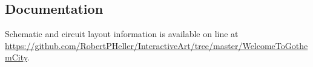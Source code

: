 \subsection*{Documentation}


Schematic and circuit layout information is available on line at 
\url{https://github.com/RobertPHeller/InteractiveArt/tree/master/WelcomeToGothemCity}.
